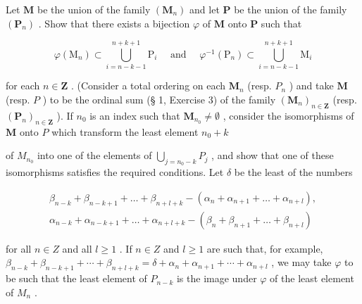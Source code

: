 Let \(\mathbf{M}\) be the union of the family \((\mathbf{M}_n)\) and let \(\mathbf{P}\) be the union of the family \((\mathbf{P}_n)\) . Show that there exists a bijection \(\varphi\) of \(\mathbf{M}\) onto \(\mathbf{P}\) such that

\[
\varphi \left(\mathrm{M} _ {n}\right) \subset \bigcup_ {i = n - k - 1} ^ {n + k + 1} \mathrm{P} _ {i} \quad \text { and } \quad \varphi^ {- 1} \left(\mathrm{P} _ {n}\right) \subset \bigcup_ {i = n - k - 1} ^ {n + k + 1} \mathrm{M} _ {i}
\]

for each \(n \in \mathbf{Z}\) . (Consider a total ordering on each \(\mathbf{M}_n\) (resp. \(P_n\) ) and take \(\mathbf{M}\) (resp. \(P\) ) to be the ordinal sum (§ 1, Exercise 3) of the family \((\mathbf{M}_n)_{n \in \mathbf{Z}}\) (resp. \((\mathbf{P}_n)_{n \in \mathbf{Z}}\) ). If \(n_0\) is an index such that \(\mathbf{M}_{n_0} \neq \emptyset\) , consider the isomorphisms of \(\mathbf{M}\) onto \(P\) which transform the least element \(n_0 + k\)

of \(M_{n_{0}}\) into one of the elements of \(\bigcup_{j=n_{0}-k} P_{j}\) , and show that one of these isomorphisms satisfies the required conditions. Let \(\delta\) be the least of the numbers

\[
\begin{array}{l} \beta_ {n - k} + \beta_ {n - k + 1} + \dots + \beta_ {n + l + k} - (\alpha_ {n} + \alpha_ {n + 1} + \dots + \alpha_ {n + l}), \\ \alpha_ {n - k} + \alpha_ {n - k + 1} + \dots + \alpha_ {n + l + k} - (\beta_ {n} + \beta_ {n + 1} + \dots + \beta_ {n + l}) \end{array}
\]

for all \(n \in Z\) and all \(l \geqslant 1\) . If \(n \in Z\) and \(l \geqslant 1\) are such that, for example, \(\beta_{n-k} + \beta_{n-k+1} + \cdots + \beta_{n+l+k} = \delta + \alpha_n + \alpha_{n+1} + \cdots + \alpha_{n+l}\) , we may take \(\varphi\) to be such that the least element of \(P_{n-k}\) is the image under \(\varphi\) of the least element of \(M_n\) .

\exercisegroup

